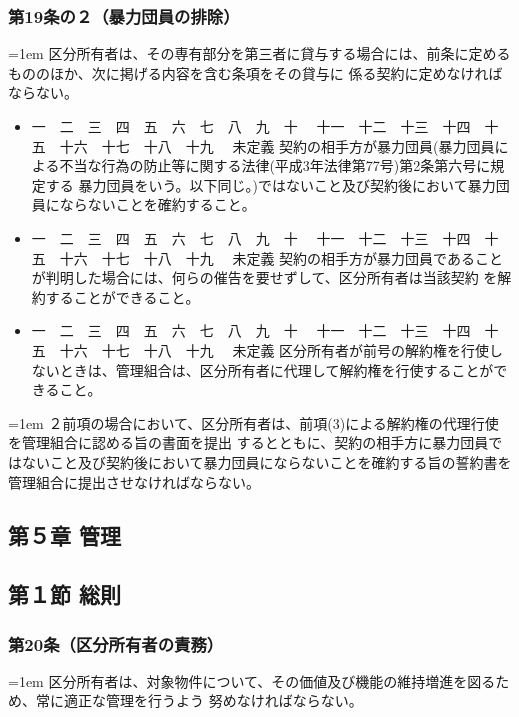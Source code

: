 \documentclass[
  luatex,
  paper=a4paper,
  fontsize=11pt,
  jafontsize=11pt,
  jlreq_notes,
]{jlreq}
\newcommand{\joumain}[1]{%
  \noindent\hangindent=1em\hangafter=1
  \hspace{1em}#1%
}
\newcommand{\kou}[2]{%
  \par\noindent\hangindent=1em\hangafter=1
  #1\hspace{1em}#2%
}
\def\toKansuji#1{
  \tempvls=#1
  \ifcase\tempvls
    \or 一　\or 二　\or 三　\or 四　\or 五　\or 六　\or 七　\or 八　\or 九　\or 十　
    \or 十一　\or 十二　\or 十三　\or 十四　\or 十五　\or 十六　\or 十七　\or 十八　\or 十九　
  \else 未定義
  \fi
}
\begin{document}
  \subsubsection*{第19条の２（暴力団員の排除）}
  \joumain{区分所有者は、その専有部分を第三者に貸与する場合には、前条に定めるもののほか、次に掲げる内容を含む条項をその貸与に
  係る契約に定めなければならない。}
  \begin{itemize}[label={}, leftmargin=3em, itemindent=-2em]
    \item \toKansuji{1}契約の相手方が暴力団員(暴力団員による不当な行為の防止等に関する法律(平成3年法律第77号)第2条第六号に規定する
    暴力団員をいう。以下同じ。)ではないこと及び契約後において暴力団員にならないことを確約すること。
  \item \toKansuji{2}契約の相手方が暴力団員であることが判明した場合には、何らの催告を要せずして、区分所有者は当該契約
    を解約することができること。
  \item \toKansuji{3}区分所有者が前号の解約権を行使しないときは、管理組合は、区分所有者に代理して解約権を行使することができること。
    \end{itemize}
  \kou{２}{前項の場合において、区分所有者は、前項(3)による解約権の代理行使を管理組合に認める旨の書面を提出
  するとともに、契約の相手方に暴力団員ではないこと及び契約後において暴力団員にならないことを確約する旨の誓約書を
  管理組合に提出させなければならない。}
  
  \begin{center}
  \subsection*{第５章 管理}
  \subsection*{第１節 総則}
  \end{center}

  \subsubsection*{第20条（区分所有者の責務）}
  \joumain{区分所有者は、対象物件について、その価値及び機能の維持増進を図るため、常に適正な管理を行うよう
  努めなければならない。}
\end{document}
